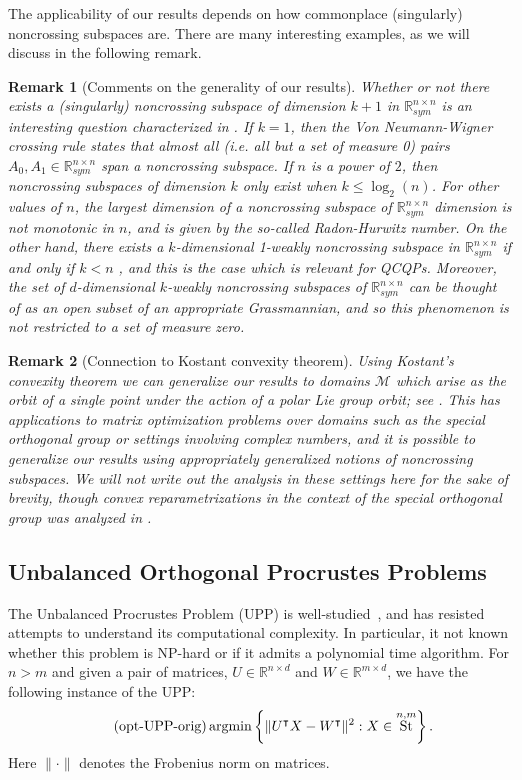 \documentclass{article}
\numberwithin{equation}{section}
\newcommand{\R}{\mathbb{R}}
\newcommand{\argmin}{\operatornamewithlimits{argmin}}
\newtheorem{remark}{Remark}
\newcommand{\cM}{{\mathcal{M}}}
\DeclareMathOperator{\St}{St}
\begin{document}
The applicability of our results depends on how commonplace (singularly) noncrossing subspaces are. There are many interesting examples, as we will discuss in the following remark.
\begin{remark}[Comments on the generality of our results]
Whether or not there exists a (singularly) noncrossing subspace of dimension $k+1$ in $\R^{n\times n}_{sym}$ is an interesting question characterized in \cite{crossing}. If $k = 1$, then the Von Neumann-Wigner crossing rule \cite{von1993verhalten} states that almost all (i.e. all but a set of measure 0) pairs $A_0, A_1 \in \R^{n \times n}_{sym}$ span a noncrossing subspace. If $n$ is a power of $2$, then noncrossing subspaces of dimension $k$ only exist when $k \le \log_2(n)$.  For other values of $n$, the largest dimension of a noncrossing subspace of $\R^{n\times n}_{sym}$ dimension is not monotonic in $n$, and is given by the so-called Radon-Hurwitz number.
On the other hand, there exists a $k$-dimensional 1-weakly noncrossing subspace in $\R^{n \times n}_{sym}$ if and only if $k < n$ \cite{friedland1976subspaces}, and this is the case which is relevant for QCQPs.
Moreover, the set of $d$-dimensional $k$-weakly noncrossing subspaces of $\R^{n\times n}_{sym}$ can be thought of as an open subset of an appropriate Grassmannian, and so this phenomenon is not restricted to a set of measure zero.
\end{remark}
\begin{remark}[Connection to Kostant convexity theorem]
Using Kostant's convexity theorem \cite{kostant1973convexity} we can generalize our results to domains $\cM$ which arise as the orbit of a single point under the action of a polar Lie group orbit; see .
This has applications to matrix optimization problems over domains such as the special orthogonal group or settings involving complex numbers, and it is possible to generalize our results using appropriately generalized notions of noncrossing subspaces. We will not write out the analysis in these settings here for the sake of brevity, though convex reparametrizations in the context of the special orthogonal group was analyzed in \cite{ramachandran2024hidden}.
\end{remark}


\subsection{Unbalanced Orthogonal Procrustes Problems}
\label{subsec:UPP}

The Unbalanced Procrustes Problem (UPP) is well-studied~\cite{zhang2020eigenvalue,UPP-relaxation},
and has resisted attempts to understand its computational complexity. In particular, it not known whether this problem is NP-hard or if it admits a polynomial time algorithm.
For $n > m$ and given a pair of matrices, $U \in \R^{n \times d}$ and $W \in \R^{m \times d}$, we have the following instance of the UPP:
\begin{equation}
\label{eq:UPP}\tag{opt-UPP-orig}
    \argmin \left\{
    \|U^{\intercal} X - W^{\intercal}\|^2
    : X \in \St^{n,m} \right\}.
\end{equation}
Here $\|\cdot\|$ denotes the Frobenius norm on matrices. 
\end{document}
